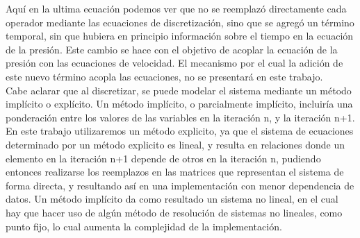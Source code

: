 \begin{minipage}{\linewidth}
Aquí en la ultima ecuación podemos ver que no se reemplazó directamente cada operador mediante las ecuaciones de discretización, sino que se agregó un término temporal, sin que hubiera en principio información sobre el tiempo en la ecuación de la presión. Este cambio se hace con el objetivo de acoplar la ecuación de la presión con las ecuaciones de velocidad. El mecanismo por el cual la adición de este nuevo término acopla las ecuaciones, no se presentará en este trabajo.
~\\

Cabe aclarar que al discretizar, se puede modelar el sistema mediante un método implícito o explícito. Un método implícito, o parcialmente implícito, incluiría una ponderación entre los valores de las variables en la iteración n, y la iteración n+1. En este trabajo utilizaremos un método explicito, ya que el sistema de ecuaciones determinado por un método explicito es lineal, y resulta en relaciones donde un elemento en la iteración n+1 depende de otros en la iteración n, pudiendo entonces realizarse los reemplazos en las matrices que representan el sistema de forma directa, y resultando así en una implementación con menor dependencia de datos. Un método implícito da como resultado un sistema no lineal, en el cual hay que hacer uso de algún método de resolución de sistemas no lineales, como punto fijo, lo cual aumenta la complejidad de la implementación.

\end{minipage}

\newpage

